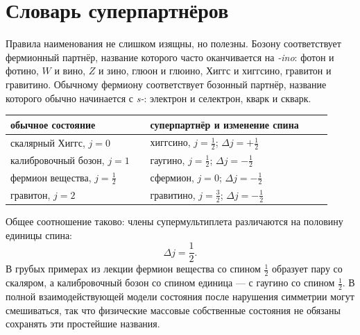 \section{Словарь суперпартнёров}

Правила наименования не слишком изящны, но полезны. Бозону соответствует фермионный партнёр, название которого часто оканчивается на \emph{-ino}: фотон и фотино, \(W\) и вино, \(Z\) и зино, глюон и глюино, Хиггс и хиггсино, гравитон и гравитино. Обычному фермиону соответствует бозонный партнёр, название которого обычно начинается с \emph{s-}: электрон и селектрон, кварк и скварк.

\begin{center}
\begin{tabular}{@{}>{\raggedright\arraybackslash}p{0.40\linewidth}>{\raggedright\arraybackslash}p{0.52\linewidth}@{}}
\toprule
обычное состояние & суперпартнёр и изменение спина\\
\midrule
скалярный Хиггс, \(j=0\) & хиггсино, \(j=\tfrac12\); \(\Delta j=+\tfrac12\)\\
калибровочный бозон, \(j=1\) & гаугино, \(j=\tfrac12\); \(\Delta j=-\tfrac12\)\\
фермион вещества, \(j=\tfrac12\) & сфермион, \(j=0\); \(\Delta j=-\tfrac12\)\\
гравитон, \(j=2\) & гравитино, \(j=\tfrac32\); \(\Delta j=-\tfrac12\)\\
\bottomrule
\end{tabular}
\end{center}

Общее соотношение таково: члены супермультиплета различаются на половину единицы спина:
\begin{equation}
\Delta j=\frac12.
\end{equation}
В грубых примерах из лекции фермион вещества со спином \(\tfrac12\) образует пару со скаляром, а калибровочный бозон со спином единица — с гаугино со спином \(\tfrac12\). В полной взаимодействующей модели состояния после нарушения симметрии могут смешиваться, так что физические массовые собственные состояния не обязаны сохранять эти простейшие названия.

\begin{classroomqa}
\end{classroomqa}

